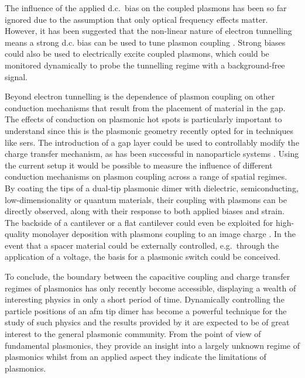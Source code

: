 \documentclass[12pt, a4paper, oneside]{book}
\begin{document}
The influence of the applied d.c.\ bias on the coupled plasmons has been so far ignored due to the assumption that only optical frequency effects matter. However, it has been suggested that the non-linear nature of electron tunnelling means a strong d.c. bias can be used to tune plasmon coupling \cite{}. Strong biases could also be used to electrically excite coupled plasmons, which could be monitored dynamically to probe the tunnelling regime with a background-free signal.

Beyond electron tunnelling is the dependence of plasmon coupling on other conduction mechanisms that result from the placement of material in the gap. The effects of conduction on plasmonic hot spots is particularly important to understand since this is the plasmonic geometry recently opted for in techniques like \gls{sers}. The introduction of a gap layer could be used to controllably modify the charge transfer mechanism, as has been successful in nanoparticle systems \cite{benz2014}. Using the current setup it would be possible to measure the influence of different conduction mechanisms on plasmon coupling across a range of spatial regimes. By coating the tips of a dual-tip plasmonic dimer with dielectric, semiconducting, low-dimensionality or quantum materials, their coupling with plasmons can be directly observed, along with their response to both applied biases and strain. The backside of a cantilever or a flat cantilever could even be exploited for high-quality monolayer deposition with plasmons coupling to an image charge \cite{mertens2013, benz2014}. In the event that a spacer material could be externally controlled, e.g.\ through the application of a voltage, the basis for a plasmonic switch could be conceived.

To conclude, the boundary between the capacitive coupling and charge transfer regimes of plasmonics has only recently become accessible, displaying a wealth of interesting physics in only a short period of time. Dynamically controlling the particle positions of an \gls{afm} tip dimer has become a powerful technique for the study of such physics and the results provided by it are expected to be of great interest to the general plasmonic community. From the point of view of fundamental plasmonics, they provide an insight into a largely unknown regime of plasmonics whilst from an applied aspect they indicate the limitations of plasmonics.

\ifstandalone
\begin{singlespace}
\fontsize{8pt}{1em}\selectfont
\printbibliography[notcategory=fullcited]
\end{singlespace}
\fi
\end{document}
